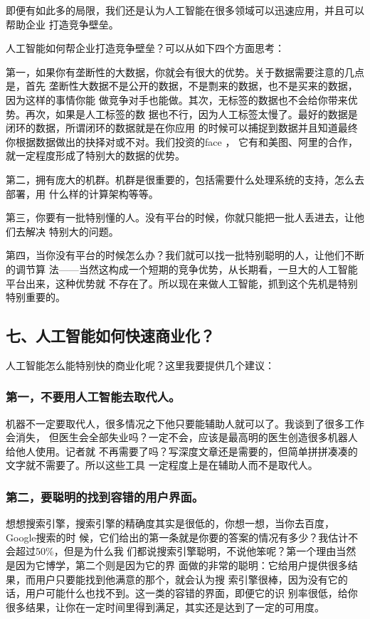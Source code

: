 \documentclass[11pt]{ctexart}
\begin{document}
{{{{即便有如此多的局限，我们还是认为人工智能在很多领域可以迅速应用，并且可以帮助企业
打造竞争壁垒。

人工智能如何帮企业打造竞争壁垒？可以从如下四个方面思考：

第一，如果你有垄断性的大数据，你就会有很大的优势。关于数据需要注意的几点是，首先
垄断性大数据不是公开的数据，不是剽来的数据，也不是买来的数据，因为这样的事情你能
做竞争对手也能做。其次，无标签的数据也不会给你带来优势。再次，如果是人工标签的数
据也不行，因为人工标签太慢了。最好的数据是闭环的数据，所谓闭环的数据就是在你应用
的时候可以捕捉到数据并且知道最终你根据数据做出的抉择对或不对。我们投资的face ，
它有和美图、阿里的合作，就一定程度形成了特别大的数据的优势。

第二，拥有庞大的机群。机群是很重要的，包括需要什么处理系统的支持，怎么去部署，用
什么样的计算架构等等。

第三，你要有一批特别懂的人。没有平台的时候，你就只能把一批人丢进去，让他们去解决
特别大的问题。

第四，当你没有平台的时候怎么办？我们就可以找一批特别聪明的人，让他们不断的调节算
法——当然这构成一个短期的竞争优势，从长期看，一旦大的人工智能平台出来，这种优势就
不存在了。所以现在来做人工智能，抓到这个先机是特别特别重要的。

\subsection{七、人工智能如何快速商业化？}
\label{sec:orgba691f5}

人工智能怎么能特别快的商业化呢？这里我要提供几个建议：


\subsubsection{第一，不要用人工智能去取代人。}
\label{sec:org1c5b4d7}

机器不一定要取代人，很多情况之下他只要能辅助人就可以了。我谈到了很多工作会消失，
但医生会全部失业吗？一定不会，应该是最高明的医生创造很多机器人给他人使用。记者就
不再需要了吗？写深度文章还是需要的，但简单拼拼凑凑的文字就不需要了。所以这些工具
一定程度上是在辅助人而不是取代人。

\subsubsection{第二，要聪明的找到容错的用户界面。}
\label{sec:org8cfabc2}

想想搜索引擎，搜索引擎的精确度其实是很低的，你想一想，当你去百度，Google搜索的时
候，它们给出的第一条就是你要的答案的情况有多少？我估计不会超过50\%，但是为什么我
们都说搜索引擎聪明，不说他笨呢？第一个理由当然是因为它博学，第二个则是因为它的界
面做的非常的聪明：它给用户提供很多结果，而用户只要能找到他满意的那个，就会认为搜
索引擎很棒，因为没有它的话，用户可能什么也找不到。这一类的容错的界面，即便它的识
别率很低，给你很多结果，让你在一定时间里得到满足，其实还是达到了一定的可用度。

}}}}
\end{document}
